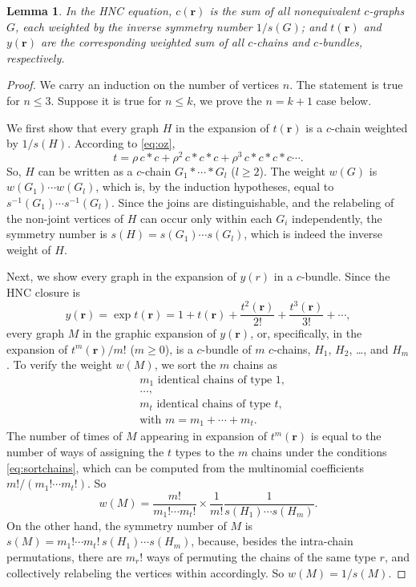 \documentclass[preprint]{revtex4-1}
\newtheorem{lemm}[thrm]{Lemma}
\newcommand{\vct}[1]{\mathbf{#1}}
\providecommand{\vr}{} %
\renewcommand{\vr}{\vct{r}}
\begin{document}
\begin{lemm}
In the HNC equation,
%
$c(\vr)$
  is the sum of all nonequivalent $c$-graphs $G$,
  each weighted by the inverse symmetry number $1/s(G)$;
and $t(\vr)$ and $y(\vr)$ are the corresponding weighted sum of all
  $c$-chains and $c$-bundles, respectively.
  \label{thm:hnccr}
\end{lemm}
%
%
%
\begin{proof}
%
We carry an induction on the number of vertices $n$.
%
The statement is true for $n \le 3$.
%
Suppose it is true for $n \le k$,
  we prove the $n = k + 1$ case below.


We first show that
  every graph $H$ in the expansion of $t(\vr)$
  is a $c$-chain weighted by $1/s(H)$.
%
According to \eqref{eq:oz},
\[
  t = \rho \, c*c + \rho^2 \, c * c * c + \rho^3 \, c*c*c*c \cdots.
\]
So, $H$ can be written as a $c$-chain
  $G_1 * \cdots * G_l$ ($l \ge 2$).
%
The weight $w(G)$ is
  $w(G_1) \cdots w(G_l)$,
  which is, by the induction hypotheses, equal to
  $s^{-1}(G_1) \cdots s^{-1}(G_l)$.
%
Since the joins are distinguishable,
  and the relabeling of the non-joint vertices  of $H$
  can occur only within each $G_i$ independently,
  the symmetry number is
  $s(H) = s(G_1) \cdots s(G_l)$,
  which is indeed the inverse weight of $H$.

Next, we show every graph in the expansion of $y(r)$
  in a $c$-bundle.
%
Since the HNC closure is
\[
  y(\vr)
= \exp t(\vr)
=
1 + t(\vr)
+ \frac{ t^2(\vr) }{ 2! }
+ \frac{ t^3(\vr) }{ 3! }+ \cdots,
\]
every graph $M$ in the graphic expansion of $y(\vr)$,
  or, specifically, in the expansion of $t^m(\vr)/m!$ ($m \ge 0$),
  is a $c$-bundle of $m$ $c$-chains,
  $H_1$, $H_2$, \dots, and $H_m$.
%
%
To verify the weight $w(M)$,
  we sort the $m$ chains as
\begin{equation}
\begin{split}
& \text{$m_1$ identical chains of type $1$}, \\
& \dots, \\
& \text{$m_t$ identical chains of type $t$}, \\
& \text{with $m = m_1 + \cdots + m_t$}.
\end{split}\label{eq:sortchains}
\end{equation}
%
The number of times of $M$
  appearing in expansion of $t^m(\vr)$
  is equal to the number of ways
  of assigning the $t$ types to the $m$ chains
  under the conditions \eqref{eq:sortchains},
  which can be computed from the multinomial coefficients
  $m!/(m_1! \cdots m_t!)$.
%
So
%
\[
  w(M)
=
  \frac{ m! } { m_1! \cdots m_t! }
  \times
  \frac{ 1 } { m! }
  \frac{ 1 } { s(H_1) \cdots s(H_m) }.
\]
%
On the other hand,
  the symmetry number of $M$ is
  $s(M) = m_1! \cdots m_t! \, s(H_1) \cdots s(H_m)$,
  because, besides the intra-chain permutations,
  there are $m_r!$ ways of permuting the chains of the same type $r$,
  and collectively relabeling the vertices within accordingly.
So $w(M) = 1/s(M)$.
%


\end{proof}
\end{document}
